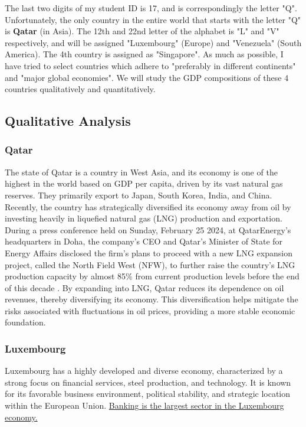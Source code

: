 \documentclass[12pt]{article}
\begin{document}
The last two digits of my student ID is 17, and is correspondingly the letter "Q". Unfortunately, the only country in the entire world that starts with the letter "Q" is \textbf{Qatar} (in Asia). The 12th and 22nd letter of the alphabet is "L" and "V" respectively, and will be assigned "Luxembourg" (Europe) and "Venezuela" (South America). The 4th country is assigned as "Singapore". As much as possible, I have tried to select countries which adhere to "preferably in different continents" and "major global economies". We will study the GDP compositions of these 4 countries qualitatively and quantitatively. 

\subsection*{Qualitative Analysis}

\subsubsection*{Qatar}

The state of Qatar is a country in West Asia, and its economy is one of the highest in the world based on GDP per capita, driven by its vast natural gas reserves. They primarily export to Japan, South Korea, India, and China. Recently, the country has strategically diversified its economy away from oil by investing heavily in liquefied natural gas (LNG) production and exportation. \\ 

\noindent During a press conference held on Sunday, February 25 2024, at QatarEnergy's headquarters in Doha, the company's CEO and Qatar's Minister of State for Energy Affairs disclosed the firm's plans to proceed with a new LNG expansion project, called the North Field West (NFW), to further raise the country's LNG production capacity by almost 85\% from current production levels before the end of this decade \cite{Cavcic_2024}. By expanding into LNG, Qatar reduces its dependence on oil revenues, thereby diversifying its economy. This diversification helps mitigate the risks associated with fluctuations in oil prices, providing a more stable economic foundation.

\subsubsection*{Luxembourg}

Luxembourg has a highly developed and diverse economy, characterized by a strong focus on financial services, steel production, and technology. It is known for its favorable business environment, political stability, and strategic location within the European Union. \href{https://www.luxembourgforfinance.com/en/financial-centre/banking/}{Banking is the largest sector in the Luxembourg economy.} \\ 
\end{document}
